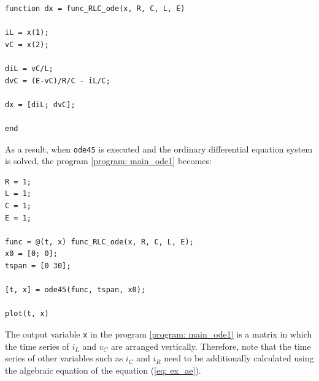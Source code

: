 \documentclass[tombow,dvipdfmx]{corona-a5-1.1}
\begin{document}
\begin{例}
\smallskip
\begin{PROGRAMA}[count,title={func\_RLC\_ode.m}]\label{program:ex1_ode}
  \begin{verbatim}
function dx = func_RLC_ode(x, R, C, L, E)

iL = x(1);
vC = x(2);

diL = vC/L;
dvC = (E-vC)/R/C - iL/C;

dx = [diL; dvC];

end
\end{verbatim}
\end{PROGRAMA}

As a result, when \verb|ode45| is executed and the ordinary differential equation system is solved, the program \nobreak\ref{program: main_ode1} becomes:

\smallskip
\begin{PROGRAMA}[count,title={main\_RLC\_ode.m}]\label{program:main_ode1}
\begin{verbatim}
R = 1;
L = 1;
C = 1;
E = 1;

func = @(t, x) func_RLC_ode(x, R, C, L, E);
x0 = [0; 0];
tspan = [0 30];

[t, x] = ode45(func, tspan, x0);

plot(t, x)
\end{verbatim}
\end{PROGRAMA}

The output variable \verb|x| in the program \nobreak\ref{program: main_ode1} is a matrix in which the time series of $i_L$ and $v_C$ are arranged vertically.
Therefore, note that the time series of other variables such as $i_C$ and $i_R$ need to be additionally calculated using the algebraic equation of the equation (\ref{eq: ex_ae}).


\end{例}
\end{document}
